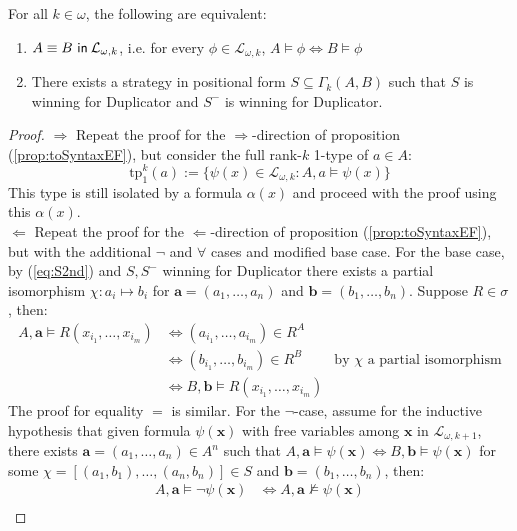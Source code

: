 \begin{prop}
For all $k \in \omega$, the following are equivalent:
\begin{enumerate}[label=(\arabic*)$_{k}$]
\item ${A \equiv B \ \mathsf{in}\: \mathcal{L}_{\omega,k}}$, i.e. for every $\phi \in \mathcal{L}_{\omega,k}$, $A \vDash \phi \Leftrightarrow B \vDash \phi$
\item There exists a strategy in positional form $S \subseteq \Gamma_{k}(A,B)$ such that $S$ is winning for Duplicator and $S^{-}$ is winning for Duplicator. 
\end{enumerate}
\begin{proof}
$\Rightarrow$ Repeat the proof for the $\Rightarrow$-direction of proposition (\ref{prop:toSyntaxEF}), but consider the full rank-$k$ 1-type of $a \in A$:
$$\text{tp}^{k}_{1}(a) := \{\psi(x) \in \mathcal{L}_{\omega,k}: A,a \vDash \psi(x) \} $$ 
This type is still isolated by a formula $\alpha(x)$ and proceed with the proof using this $\alpha(x)$. \\
$\Leftarrow$ Repeat the proof for the $\Leftarrow$-direction of proposition (\ref{prop:toSyntaxEF}), but with the additional $\neg$ and $\forall$ cases and modified base case. For the base case, by (\ref{eq:S2nd}) and $S,S^{-}$ winning for Duplicator there exists a partial isomorphism $\chi:a_{i} \mapsto b_{i}$ for $\mathbf{a} = (a_{1},\dots,a_{n})$ and $\mathbf{b} = (b_{1},\dots,b_{n})$. Suppose $R \in \sigma$, then: 
\begin{align*}
A,\mathbf{a} \vDash R(x_{i_{1}},\dots,x_{i_{m}}) &\Leftrightarrow (a_{i_{1}},\dots,a_{i_{m}}) \in R^{A} \\
&\Leftrightarrow (b_{i_{1}},\dots,b_{i_{m}}) \in R^{B} & \text{by $\chi$ a partial isomorphism} \\
&\Leftrightarrow B,\mathbf{b} \vDash R(x_{i_{1}},\dots,x_{i_{m}})
\end{align*}
The proof for equality $=$ is similar. For the $\neg$-case, assume for the inductive hypothesis that given formula $\psi(\mathbf{x})$ with free variables among $\mathbf{x}$ in $\mathcal{L}_{\omega,k+1}$, there exists $\mathbf{a} = (a_{1},\dots,a_{n}) \in A^{n}$ such that $A,\mathbf{a} \vDash \psi(\mathbf{x}) \Leftrightarrow B,\mathbf{b} \vDash \psi(\mathbf{x})$ for some $\chi = [(a_{1},b_{1}),\dots,(a_{n},b_{n})] \in S$ and $\mathbf{b} = (b_{1},\dots,b_{n})$, then:
\begin{align*}
A,\mathbf{a} \vDash \neg\psi(\mathbf{x}) &\Leftrightarrow A,\mathbf{a} \not\vDash \psi(\mathbf{x}) \\

\end{align*}
\end{proof}
\end{prop}
